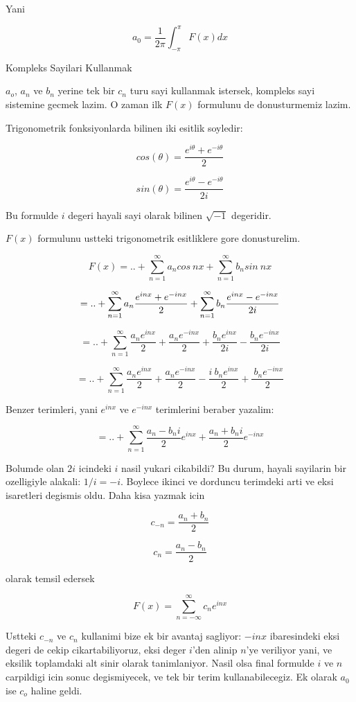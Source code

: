 \documentclass[12pt,fleqn]{article}\usepackage{../common}
\begin{document}
Yani

\[ a_0 = \frac{1}{2\pi}\int_{-\pi}^{\pi}F(x)dx \]

Kompleks Sayilari Kullanmak

$a_o$, $a_n$ ve $b_n$ yerine tek bir $c_n$ turu sayi kullanmak istersek,
kompleks sayi sistemine gecmek lazim. O zaman ilk $F(x)$ formulunu de
donusturmemiz lazim.

Trigonometrik fonksiyonlarda bilinen iki esitlik soyledir:

\[ cos(\theta) = \frac{e^{i\theta}+e^{-i\theta}}{2} \]

\[ sin(\theta) = \frac{e^{i\theta}-e^{-i\theta}}{2i}  \]

Bu formulde $i$ degeri hayali sayi olarak bilinen $\sqrt{-1}$ degeridir. 

$F(x)$ formulunu ustteki trigonometrik esitliklere gore donusturelim. 

\[ F(x) = .. +  \sum_{n=1}^{\infty}a_ncos \ nx + \sum_{n=1}^{\infty}b_nsin \ nx \]

\[ = .. + \sum_{n=1}^{\infty} a_n \frac{e^{inx} + e^{-inx}}{2} +  \sum_{n=1}^{\infty} b_n \frac{e^{inx} - e^{-inx}}{2i}\\ \]

\[ = .. + \sum_{n=1}^{\infty} \frac{a_ne^{inx}}{2} + \frac{a_ne^{-inx}}{2} +
\frac{b_ne^{inx}}{2i} - \frac{b_ne^{-inx}}{2i} \]

\[ = .. + \sum_{n=1}^{\infty} \frac{a_ne^{inx}}{2} + \frac{a_ne^{-inx}}{2} -
\frac{i \ b_ne^{inx}}{2} + \frac{ \ b_ne^{-inx}}{2} \]

Benzer terimleri, yani $e^{inx}$ ve $e^{-inx}$ terimlerini beraber yazalim:

\[ = .. + \sum_{n=1}^{\infty} \frac{a_n-b_ni}{2}e^{inx} + \frac{a_n+b_ni}{2}e^{-inx} \]

Bolumde olan $2i$ icindeki $i$ nasil yukari cikabildi? Bu durum, hayali
sayilarin bir ozelligiyle alakali: $1/i = -i$. Boylece ikinci ve dorduncu
terimdeki arti ve eksi isaretleri degismis oldu. Daha kisa yazmak icin

\[ c_{-n} = \frac{a_n + b_n}{2} \]

\[ c_{n} = \frac{a_n - b_n}{2} \]

olarak temsil edersek

\begin{equation} F(x) = \sum_{n=-\infty}^{\infty} c_ne^{inx} \label{complexfourier} \end{equation}

Ustteki $c_{-n}$ ve $c_n$ kullanimi bize ek bir avantaj sagliyor: $-inx$
ibaresindeki eksi degeri de cekip cikartabiliyoruz, eksi deger $i$'den alinip
$n$'ye veriliyor yani, ve eksilik toplamdaki alt sinir olarak
tanimlaniyor. Nasil olsa final formulde $i$ ve $n$ carpildigi icin sonuc
degismiyecek, ve tek bir terim kullanabilecegiz. Ek olarak $a_0$ ise $c_o$
haline geldi.
\end{document}
